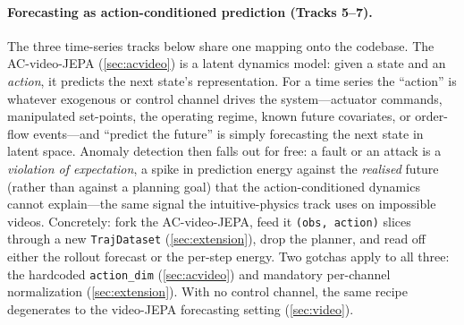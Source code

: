 \documentclass{article}
\newcommand{\code}[1]{\texttt{\small #1}}
\begin{document}
\paragraph{Forecasting as action-conditioned prediction (Tracks 5--7).} The
three time-series tracks below share one mapping onto the codebase. The
AC-video-JEPA (\cref{sec:acvideo}) is a latent dynamics model: given a state and
an \emph{action}, it predicts the next state's representation. For a time series
the ``action'' is whatever exogenous or control channel drives the
system---actuator commands, manipulated set-points, the operating regime, known
future covariates, or order-flow events---and ``predict the future'' is simply
forecasting the next state in latent space. Anomaly detection then falls out for
free: a fault or an attack is a \emph{violation of expectation}, a spike in
prediction energy against the \emph{realised} future (rather than against a
planning goal) that the action-conditioned dynamics cannot explain---the same
signal the intuitive-physics track uses on impossible videos. Concretely: fork
the AC-video-JEPA, feed it \code{(obs, action)} slices through a new
\code{TrajDataset} (\cref{sec:extension}), drop the planner, and read off either
the rollout forecast or the per-step energy. Two gotchas apply to all three: the
hardcoded \code{action\_dim} (\cref{sec:acvideo}) and mandatory per-channel
normalization (\cref{sec:extension}). With no control channel, the same recipe
degenerates to the video-JEPA forecasting setting (\cref{sec:video}).


\end{document}
